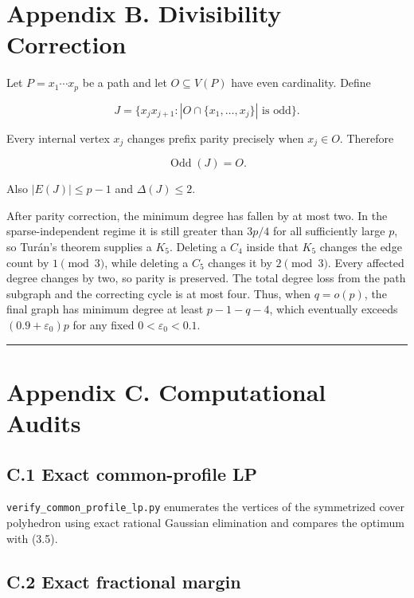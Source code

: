 \documentclass[
  american,
  11pt,
  a4paper,
]{article}
\begin{document}
\section{Appendix B. Divisibility Correction}\label{appendix-b.-divisibility-correction}

Let \(P=x_1\cdots x_p\) be a path and let \(O\subseteq V(P)\) have even cardinality. Define

\[
J=\{x_jx_{j+1}:|O\cap\{x_1,\ldots,x_j\}|\text{ is odd}\}.
\]

Every internal vertex \(x_j\) changes prefix parity precisely when \(x_j\in O\). Therefore

\[
\operatorname{Odd}(J)=O.
\]

Also \(|E(J)|\le p-1\) and \(\Delta(J)\le2\).

After parity correction, the minimum degree has fallen by at most two. In the sparse-independent regime it is still greater than \(3p/4\) for all sufficiently large \(p\), so Turán's theorem supplies a \(K_5\). Deleting a \(C_4\) inside that \(K_5\) changes the edge count by \(1\pmod3\), while deleting a \(C_5\) changes it by \(2\pmod3\). Every affected degree changes by two, so parity is preserved. The total degree loss from the path subgraph and the correcting cycle is at most four. Thus, when \(q=o(p)\), the final graph has minimum degree at least \(p-1-q-4\), which eventually exceeds \((0.9+\varepsilon_0)p\) for any fixed \(0<\varepsilon_0<0.1\).

\begin{center}\rule{0.5\linewidth}{0.5pt}\end{center}

\section{Appendix C. Computational Audits}\label{appendix-c.-computational-audits}

\subsection{C.1 Exact common-profile LP}\label{c.1-exact-common-profile-lp}

\texttt{verify\_common\_profile\_lp.py} enumerates the vertices of the symmetrized cover polyhedron using exact rational Gaussian elimination and compares the optimum with (3.5).

\subsection{C.2 Exact fractional margin}\label{c.2-exact-fractional-margin}
\end{document}
